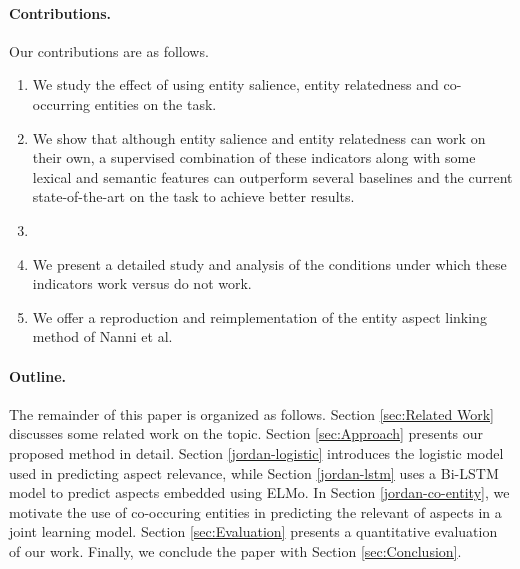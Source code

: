 \paragraph{\textbf{Contributions.}} 


Our contributions are as follows.
\begin{enumerate}

    \item We study the effect of using entity salience, entity relatedness and co-occurring entities on the task.
    \item We show that although entity salience and entity relatedness can work on their own, a supervised combination of these indicators along with some lexical and semantic features can outperform several baselines and the current state-of-the-art on the task to achieve better results.
    \item {}
    \item We present a detailed study and analysis of the conditions under which these indicators work versus do not work. 
    \item We offer a reproduction and reimplementation of the entity aspect linking method of Nanni et al.
\end{enumerate}

\paragraph{\textbf{Outline.}} The remainder of this paper is organized as follows. Section \ref{sec:Related Work} discusses some related work on the topic. Section \ref{sec:Approach} presents our proposed method in detail. Section \ref{jordan-logistic} introduces the logistic model used in predicting aspect relevance, while Section \ref{jordan-lstm} uses a Bi-LSTM model to predict aspects embedded using ELMo. In Section \ref{jordan-co-entity}, we motivate the use of co-occuring entities in predicting the relevant of aspects in a joint learning model.  Section \ref{sec:Evaluation} presents a quantitative evaluation of our work. Finally, we conclude the paper with Section \ref{sec:Conclusion}.
